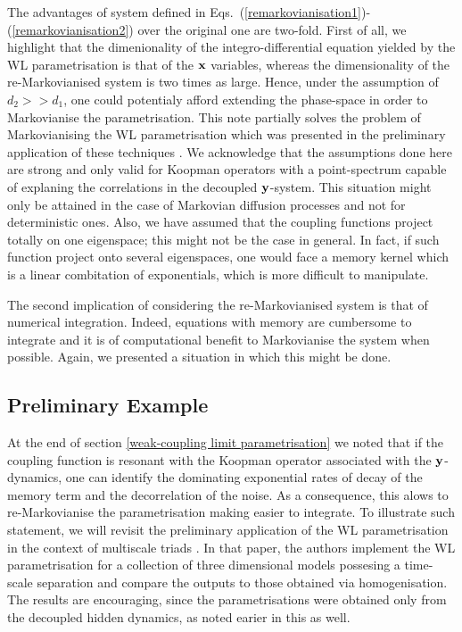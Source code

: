 \documentclass[12pt]{article}
\begin{document}
The advantages of system defined in Eqs.~(\ref{remarkovianisation1})-(\ref{remarkovianisation2}) over the original one are two-fold. First of all, we highlight that the dimenionality of the integro-differential equation yielded by the WL parametrisation is that of the $\mathbf{x}$ variables, whereas the dimensionality of the re-Markovianised system is two times as large. Hence, under the assumption of $d_2>>d_1$, one could potentialy afford extending the phase-space in order to Markovianise the parametrisation. This note partially solves the problem of Markovianising the WL parametrisation which was presented in the preliminary application of these techniques \cite{Wouters2016}. We acknowledge that the assumptions done here are strong and only valid for Koopman operators with a point-spectrum capable of explaning the correlations in the decoupled $\mathbf{y}$-system. This situation might only be attained in the case of Markovian diffusion processes and not for deterministic ones. Also, we have assumed that the coupling functions project totally on one eigenspace; this might not be the case in general. In fact, if such function project onto several eigenspaces, one would face a memory kernel which is a linear combitation of exponentials, which is more difficult to manipulate.

The second implication of considering the re-Markovianised system is that of numerical integration. Indeed, equations with memory are cumbersome to integrate and it is of computational benefit to Markovianise the system when possible. Again, we presented a situation in which this might be done.


\subsection{Preliminary Example}

At the end of section \ref{weak-coupling limit parametrisation} we noted that if the coupling function is resonant with the Koopman operator associated with the $\mathbf{y}$-dynamics, one can identify the dominating exponential rates of decay of the memory term and the decorrelation of the noise. As a consequence, this alows to re-Markovianise the parametrisation making easier to integrate. To illustrate such statement, we will revisit the preliminary application of the WL parametrisation in the context of multiscale triads \cite{Wouters2016}. In that paper, the authors implement the WL parametrisation for a collection of three dimensional models possesing a time-scale separation and compare the outputs to those obtained via homogenisation. The results are encouraging, since the parametrisations were obtained only from the decoupled hidden dynamics, as noted earier in this as well.
\end{document}
